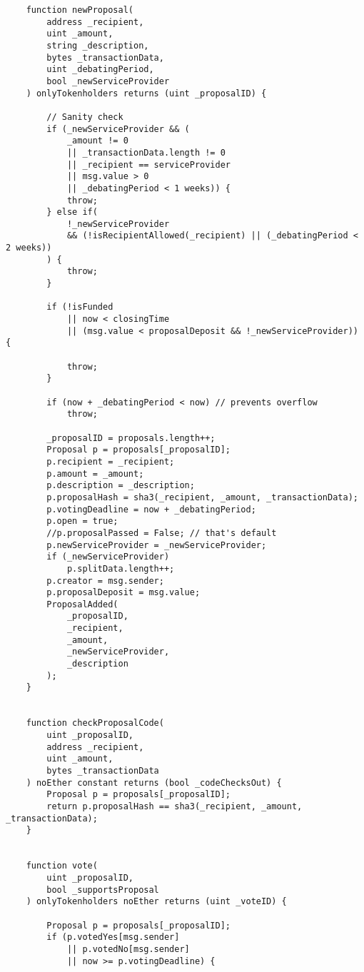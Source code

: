 \documentclass[9pt,oneside]{amsart}
\begin{document}
\begin{appendix}
\begin{verbatim}
    function newProposal(
        address _recipient,
        uint _amount,
        string _description,
        bytes _transactionData,
        uint _debatingPeriod,
        bool _newServiceProvider
    ) onlyTokenholders returns (uint _proposalID) {

        // Sanity check
        if (_newServiceProvider && (
            _amount != 0
            || _transactionData.length != 0
            || _recipient == serviceProvider
            || msg.value > 0
            || _debatingPeriod < 1 weeks)) {
            throw;
        } else if(
            !_newServiceProvider
            && (!isRecipientAllowed(_recipient) || (_debatingPeriod < 2 weeks))
        ) {
            throw;
        }

        if (!isFunded
            || now < closingTime
            || (msg.value < proposalDeposit && !_newServiceProvider)) {

            throw;
        }

        if (now + _debatingPeriod < now) // prevents overflow
            throw;

        _proposalID = proposals.length++;
        Proposal p = proposals[_proposalID];
        p.recipient = _recipient;
        p.amount = _amount;
        p.description = _description;
        p.proposalHash = sha3(_recipient, _amount, _transactionData);
        p.votingDeadline = now + _debatingPeriod;
        p.open = true;
        //p.proposalPassed = False; // that's default
        p.newServiceProvider = _newServiceProvider;
        if (_newServiceProvider)
            p.splitData.length++;
        p.creator = msg.sender;
        p.proposalDeposit = msg.value;
        ProposalAdded(
            _proposalID,
            _recipient,
            _amount,
            _newServiceProvider,
            _description
        );
    }


    function checkProposalCode(
        uint _proposalID,
        address _recipient,
        uint _amount,
        bytes _transactionData
    ) noEther constant returns (bool _codeChecksOut) {
        Proposal p = proposals[_proposalID];
        return p.proposalHash == sha3(_recipient, _amount, _transactionData);
    }


    function vote(
        uint _proposalID,
        bool _supportsProposal
    ) onlyTokenholders noEther returns (uint _voteID) {

        Proposal p = proposals[_proposalID];
        if (p.votedYes[msg.sender]
            || p.votedNo[msg.sender]
            || now >= p.votingDeadline) {


\end{verbatim}
\end{appendix}
\end{document}

